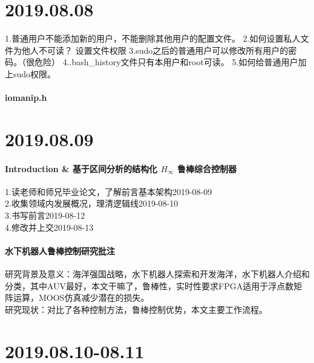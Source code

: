 \documentclass[UTF8,a4paper]{ctexart}
\begin{document}
\section{2019.08.08}
1.普通用户不能添加新的用户，不能删除其他用户的配置文件。
2.如何设置私人文件为他人不可读？  设置文件权限
3.sudo之后的普通用户可以修改所有用户的密码。（很危险）
4..bash_history文件只有本用户和root可读。
5.如何给普通用户加上sudo权限。
\paragraph{iomanip.h}
\section{2019.08.09}
\paragraph{Introduction \& 基于区间分析的结构化 $H_\infty$ 鲁棒综合控制器}
1.读老师和师兄毕业论文，了解前言基本架构2019-08-09\\
2.收集领域内发展概况，理清逻辑线2019-08-10\\
3.书写前言2019-08-12\\
4.修改并上交2019-08-13\\
\paragraph{水下机器人鲁棒控制研究批注}
研究背景及意义：海洋强国战略，水下机器人探索和开发海洋，水下机器人介绍和分类，其中AUV最好，本文干嘛了，鲁棒性，实时性要求FPGA适用于浮点数矩阵运算，MOOS仿真减少潜在的损失。\\
研究现状：对比了各种控制方法，鲁棒控制优势，本文主要工作流程。\\
\section{2019.08.10-08.11}
\end{document}
